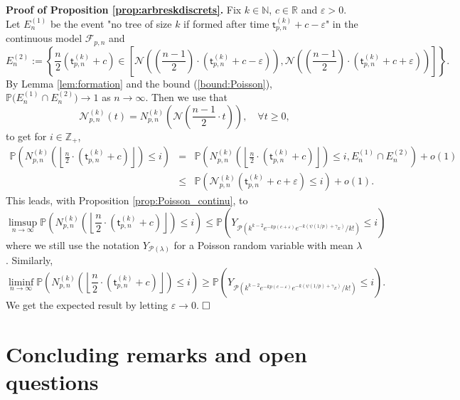 \documentclass[a4, 11pt]{article}
\numberwithin{equation}{section}
\theoremstyle{plain}
\theoremstyle{definition}
\theoremstyle{remark}
\begin{document}
\textbf{Proof of Proposition \ref{prop:arbreskdiscrets}.}
Fix $k \in \mathbb N$, $c\in \mathbb R$ and $\varepsilon>0$. 
Let $E_{n}^{(1)}$ be the event "no tree of size $k$ if formed after time $\mathsf t^{(k)}_{p,n}+c-\varepsilon$" in the continuous model $\mathcal {F}_{p,n}$ and $$E_{n}^{(2)}:=\left\{\frac{n}{2}(\mathsf t^{(k)}_{p,n}+c) \in \left[\mathcal N\left(\left(\frac{n-1}{2}\right) \cdot (\mathsf t^{(k)}_{p,n}+c-\varepsilon)\right), \mathcal N\left(\left(\frac{n-1}{2}\right)\cdot(\mathsf t^{(k)}_{p,n}+c+\varepsilon)\right)\right] \right\}.$$
By Lemma \ref{lem:formation} and the bound (\ref{bound:Poisson}), $\mathbb P\big(E_{n}^{(1)} \cap E_{n}^{(2)}\big) \rightarrow 1$ as $n \rightarrow \infty$. Then we use that 
$$
\mathcal N^{(k)}_{p,n}(t)=N_{p,n}^{(k)}\left(\mathcal N \left(\frac{n-1}{2} \cdot t \right) \right), \quad \forall t \geq 0,
$$
to get for $i \in \mathbb Z_+$, 
\begin{eqnarray*}
\mathbb P\left(N_{p,n}^{(k)}\left(\left\lfloor \frac{n}{2} \cdot (\mathsf t^{(k)}_{p,n}+c)\right\rfloor\right) \leq i \right)&=&\mathbb P\left(N_{p,n}^{(k)}\left(\left\lfloor \frac{n}{2} \cdot (\mathsf t^{(k)}_{p,n}+c)\right\rfloor\right) \leq i, E_{n}^{(1)} \cap E_{n}^{(2)} \right) +o(1) \\
&\leq & \mathbb P\left(\mathcal N_{p,n}^{(k)}\left(\mathsf t^{(k)}_{p,n}+c+\varepsilon \right) \leq i \right) +o(1).
\end{eqnarray*}
This leads, with Proposition \ref{prop:Poisson_continu}, to 
$$
\limsup_{n \rightarrow \infty} \mathbb P\left(N_{p,n}^{(k)}\left(\left\lfloor \frac{n}{2} \cdot (\mathsf t^{(k)}_{p,n}+c)\right\rfloor\right) \leq i \right) \leq \mathbb P\left(Y_{\mathcal P\left(k^{k-2}e^{-kp(c+\varepsilon)}e^{-k(\psi(1/p)+\gamma_E)}/k!\right)} \leq i \right)
$$
where we still use the notation $Y_{\mathcal P(\lambda)}$ for a Poisson random variable with mean $\lambda$.
Similarly,
$$
\liminf_{n \rightarrow \infty} \mathbb P\left(N_{p,n}^{(k)}\left(\left\lfloor \frac{n}{2} \cdot (\mathsf t^{(k)}_{p,n}+c)\right\rfloor\right) \leq i \right) \geq \mathbb P\left(Y_{\mathcal P\left(k^{k-2}e^{-kp(c-\varepsilon)}e^{-k(\psi(1/p)+\gamma_E)}/k!\right)} \leq i \right).
$$
We get the expected result by letting $\varepsilon \rightarrow 0$.
$\hfill \square$



\section{Concluding remarks and open questions}
\label{sec:open}
\end{document}
